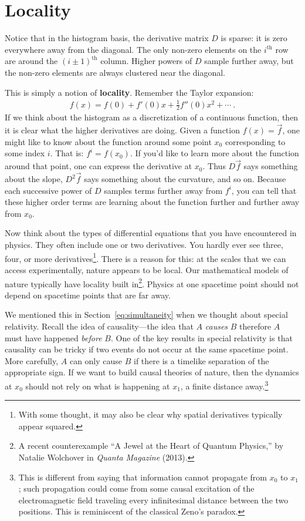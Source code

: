 \documentclass[12pt, oneside]{report}    %
\let\oldsection\section
\def\section{%
  \setcounter{sidenote}{1}%
  \oldsection
}
\begin{document}
\section{Locality}
\label{sec:locality}

Notice that in the histogram basis, the derivative matrix $D$ is sparse: it is zero everywhere away from the diagonal. The only non-zero elements on the $i^\text{th}$ row are around the $(i\pm 1)^\text{th}$ column.  Higher powers of $D$ sample further away, but the non-zero elements are always clustered near the diagonal.

This is simply a notion of \textbf{locality}. Remember the Taylor expansion:
\begin{align}
  f(x) = f(0) + f'(0) x + \frac{1}{2} f''(0)x^2 + \cdots \ .
\end{align}
If we think about the histogram as a discretization of a continuous function, then it is clear what the higher derivatives are doing. Given a function $f(x) = \vec{f}$, one might like to know about the function around some point $x_0$ corresponding to some index $i$. That is: $f^i = f(x_0)$. If you’d like to learn more about the function around that point, one can express the derivative at $x_0$. Thus $D\vec{f}$ says something about the slope, $D^2\vec{f}$ says something about the curvature, and so on. Because each successive power of $D$ samples terms further away from $f^i$, you can tell that these higher order terms are learning about the function further and further away from $x_0$. 

Now think about the types of differential equations that you have encountered in physics. They often include one or two derivatives. You hardly ever see three, four, or more derivatives\footnote{With some thought, it may also be clear why spatial derivatives typically appear squared.}. There is a reason for this: at the scales that we can access experimentally, nature appears to be local. Our mathematical models of nature typically have locality built in\footnote{A recent counterexample ``A Jewel at the Heart of Quantum Physics,'' by Natalie Wolchover in \emph{Quanta Magazine} (2013).
}. Physics at one spacetime point should not depend on spacetime points that are far away. 

We mentioned this in Section~\ref{eq:simultaneity} when we thought about special relativity. Recall the idea of causality---the idea that $A$ \emph{causes} $B$ therefore $A$ must have happened \emph{before} $B$. One of the key results in special relativity is that causality can be tricky if two events do not occur at the same spacetime point. More carefully, $A$ can only cause $B$ if there is a timelike separation of the appropriate sign.  If we want to build causal theories of nature, then the dynamics at $x_0$ should not rely on what is happening at $x_1$, a finite distance away.\footnote{This is different from saying that information cannot propagate from $x_0$ to $x_1$; such propagation could come from some causal excitation of the electromagnetic field traveling every infinitesimal distance between the two positions. This is reminiscent of the classical Zeno's paradox.}
\end{document}
